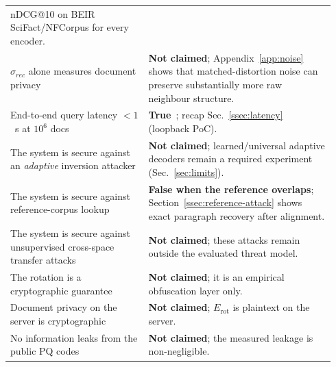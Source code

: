 \documentclass[11pt,a4paper]{article}
\begin{document}
\begin{table}[tbp]
\begin{tabular}{@{}p{0.40\linewidth}p{0.54\linewidth}@{}}
nDCG@10 on BEIR SciFact/NFCorpus for every encoder. \\
$\sigma_{rec}$ alone measures document privacy &
\textbf{Not claimed}; Appendix~\ref{app:noise} shows that
matched-distortion noise can preserve substantially more raw neighbour
structure. \\
End-to-end query latency $<1$~s at $10^6$ docs &
\textbf{True}~\cite{ref_alpha}; recap Sec.~\ref{ssec:latency} (loopback PoC). \\
The system is secure against an \emph{adaptive} inversion attacker &
\textbf{Not claimed}; learned/universal adaptive decoders remain a
required experiment (Sec.~\ref{sec:limits}). \\
The system is secure against reference-corpus lookup &
\textbf{False when the reference overlaps}; Section~\ref{ssec:reference-attack}
shows exact paragraph recovery after alignment. \\
The system is secure against unsupervised cross-space transfer attacks &
\textbf{Not claimed}; these attacks remain outside the evaluated threat
model. \\
The rotation is a cryptographic guarantee &
\textbf{Not claimed}; it is an empirical obfuscation layer only. \\
Document privacy on the server is cryptographic &
\textbf{Not claimed}; $E_{\mathrm{rot}}$ is plaintext on the server. \\
No information leaks from the public PQ codes &
\textbf{Not claimed}; the measured leakage is non-negligible. \\
\bottomrule
\end{tabular}
\end{table}
\end{document}
